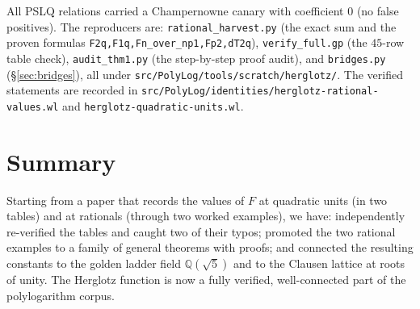 \documentclass[11pt]{article}
\theoremstyle{plain}\newtheorem{theorem}{Theorem}\newtheorem{proposition}[theorem]{Proposition}
\theoremstyle{remark}\newtheorem{remark}[theorem]{Remark}
\begin{document}
\noindent All PSLQ relations carried a Champernowne canary with coefficient $0$ (no false positives). The
reproducers are: \texttt{rational\_harvest.py} (the exact sum and the proven formulas
\texttt{F2q,F1q,Fn\_over\_np1,Fp2,dT2q}), \texttt{verify\_full.gp} (the $45$-row table check),
\texttt{audit\_thm1.py} (the step-by-step proof audit), and \texttt{bridges.py} (\S\ref{sec:bridges}), all
under \texttt{src/PolyLog/tools/scratch/herglotz/}. The verified statements are recorded in
\texttt{src/PolyLog/identities/herglotz-rational-values.wl} and
\texttt{herglotz-quadratic-units.wl}.

\section*{Summary}
Starting from a paper that records the values of $F$ at quadratic units (in two tables) and at rationals
(through two worked examples), we have: independently re-verified the tables and caught two of their typos;
promoted the two rational examples to a family of general theorems with proofs; and connected the resulting
constants to the golden ladder field $\mathbb Q(\sqrt5)$ and to the Clausen lattice at roots of unity. The
Herglotz function is now a fully verified, well-connected part of the polylogarithm corpus.
\end{document}
